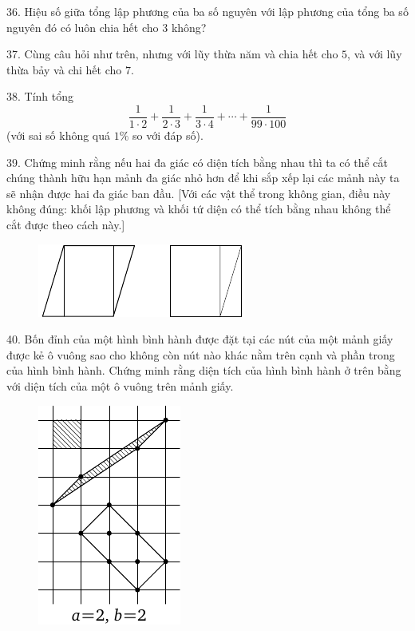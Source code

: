 \begin{problem}{36.}
	Hiệu số giữa tổng lập phương của ba số nguyên với lập phương của tổng ba số nguyên đó có luôn chia hết cho $3$ không?
\end{problem}

\begin{problem}{37.}
	Cùng câu hỏi như trên, nhưng với lũy thừa năm và chia hết cho $5$, và với lũy thừa bảy và chi hết cho $7$.
\end{problem}

\begin{problem}{38.}
	Tính tổng
	\begin{equation*}
		\frac{1}{1\cdot 2} + \frac{1}{2\cdot 3} + \frac{1}{3\cdot 4} + \dotsb + \frac{1}{99\cdot 100}
	\end{equation*}
	(với sai số không quá $1\%$ so với đáp số).
\end{problem}

\begin{problem}{39.}
	Chứng minh rằng nếu hai đa giác có diện tích bằng nhau thì ta có thể cắt chúng thành hữu hạn mảnh đa giác nhỏ hơn để khi sắp xếp lại các mảnh này ta sẽ nhận được hai đa giác ban đầu. [Với các vật thể trong không gian, điều này không đúng: khối lập phương và khối tứ diện có thể tích bằng nhau không thể cắt được theo cách này.]
	\begin{figure}
		\includegraphics{q39_horizontal}
	\end{figure}
\end{problem}

\begin{problem}{40.}
	Bốn đỉnh của một hình bình hành được đặt tại các nút của một mảnh giấy được kẻ ô vuông sao cho không còn nút nào khác nằm trên cạnh và phần trong của hình bình hành. Chứng minh rằng diện tích của hình bình hành ở trên bằng với diện tích của một ô vuông trên mảnh giấy.
	\begin{figure}
		\includegraphics{taskbook-24}
	\end{figure}
\end{problem}

